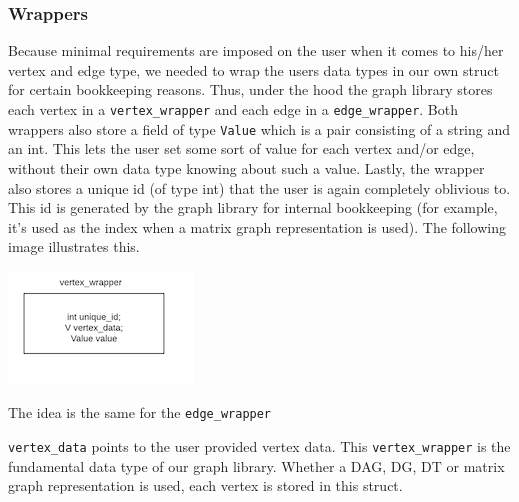 \documentclass{article}
\begin{document}
\subsubsection{Wrappers}
Because minimal requirements are imposed on the user when it comes to his/her vertex and edge type, we needed to wrap the users data types in our own struct for certain bookkeeping reasons. Thus, under the hood the graph library stores each vertex in a \texttt{vertex\_wrapper} and each edge in a \texttt{edge\_wrapper}. Both wrappers also store a field of type \texttt{Value} which is a pair consisting of a string and an int. This lets the user set some sort of value for each vertex and/or edge, without their own data type knowing about such a value. Lastly, the wrapper also stores a unique id (of type int) that the user is again completely oblivious to. This id is generated by the graph library for internal bookkeeping (for example, it's used as the index when a matrix graph representation is used). The following image illustrates this.

\includegraphics{vertexwrapper}

The idea is the same for the \texttt{edge\_wrapper}

\texttt{vertex\_data} points to the user provided vertex data. This \texttt{vertex\_wrapper} is the fundamental data type of our graph library. Whether a DAG, DG, DT or matrix graph representation is used, each vertex is stored in this struct. 
\end{document}
